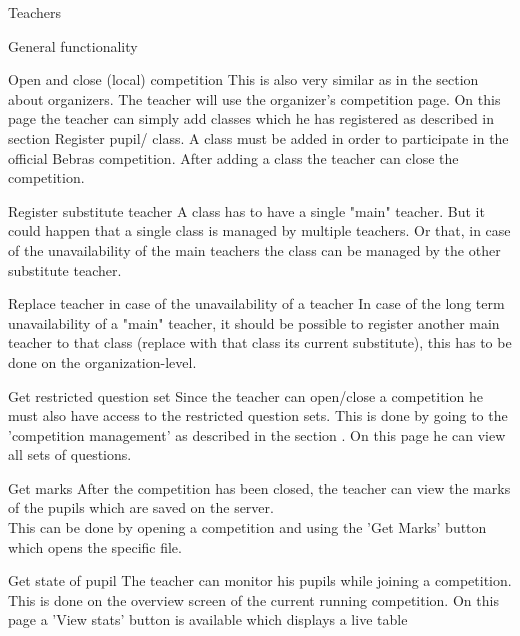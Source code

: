 \begin{section}{Teachers}
\begin{subsection}{General functionality}
        \begin{subsubsection}{Open and close (local) competition}
            This is also very similar as in the section about organizers. The teacher will use the organizer's competition page.
            On this page the teacher can simply add classes which he has registered as described in section Register pupil/ class.
            A class must be added in order to participate in the official Bebras competition. After adding a class the teacher can
            close the competition.\\
        \end{subsubsection}
        \begin{subsection}{Register substitute teacher}
        A class has to have a single "main" teacher. But it could happen that a single class is managed by multiple teachers. Or that, in case of the unavailability of the main teachers the class can be managed by the other substitute teacher.
        \end{subsection}
        \begin{subsection}{Replace teacher in case of the unavailability of a teacher}
        In case of the long term unavailability of a "main" teacher, it should be possible to register another main teacher to that class (replace with that class its current substitute), this has to be done on the organization-level. 
        \end{subsection}
        \begin{subsubsection}{Get restricted question set}
            Since the teacher can open/close a competition he must also have access to the restricted question sets. This is done by going
            to the 'competition management' as described in the section . On this page he can view all sets of questions.
        \end{subsubsection}
        \begin{subsubsection}{Get marks}
            After the competition has been closed, the teacher can view the marks of the pupils which are saved on the server.\\
            This can be done by opening a competition and using the 'Get Marks' button which opens the specific file.
        \end{subsubsection}
        \begin{subsubsection}{Get state of pupil}
            The teacher can monitor his pupils while joining a competition. This is done on the overview screen of the current running competition. On this page a 'View stats' button is available which displays a live table 

\end{subsubsection}
\end{subsection}
\end{section}
